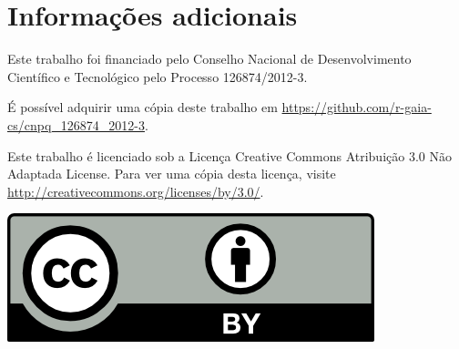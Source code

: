 % 
% 
% 

\section{Informa\c{c}\~{o}es adicionais}
Este trabalho foi financiado pelo Conselho Nacional de Desenvolvimento
Cient\'{i}fico e Tecnol\'{o}gico pelo Processo 126874/2012-3.

É possível adquirir uma cópia deste trabalho em \url{https://github.com/r-gaia-cs/cnpq_126874_2012-3}.

Este trabalho \'{e} licenciado sob a Licen\c{c}a Creative Commons
Atribui\c{c}\~{a}o 3.0 N\~{a}o Adaptada License. Para ver uma c\'{o}pia desta
licen\c{c}a, visite \url{http://creativecommons.org/licenses/by/3.0/}.
\begin{center}
    \includegraphics{figures/cc-by.png}
\end{center}
